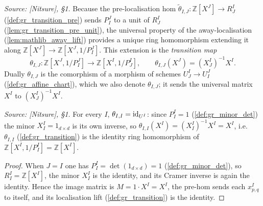 \begin{definition}\leanok
  \label{def:gr_transition}
  \textit{Source: [Nitsure], \S 1.}
  Because the pre-localisation hom \(\tilde\theta_{I,J} : \mathbb{Z}[X^J] \to
  R^I_J\) (\cref{def:gr_transition_pre}) sends \(P^J_I\) to a unit of \(R^I_J\)
  (\cref{lem:gr_transition_pre_unit}), the universal property of the
  away-localisation (\cref{lem:mathlib_away_lift}) provides a unique ring
  homomorphism extending it along \(\mathbb{Z}[X^J] \to \mathbb{Z}[X^J, 1/P^J_I]\).
  This extension is the \emph{transition map}
  \[
    \theta_{I,J} : \mathbb{Z}[X^J, 1/P^J_I] \longrightarrow
    \mathbb{Z}[X^I, 1/P^I_J], \qquad \theta_{I,J}(X^J) = (X^I_J)^{-1} X^I .
  \]
  Dually \(\theta_{I,J}\) is the comorphism of a morphism of schemes
  \(U^I_J \to U^J_I\) (\cref{def:gr_affine_chart}), which we also denote
  \(\theta_{I,J}\); it sends the universal matrix \(X^I\) to \((X^I_J)^{-1} X^I\).
\end{definition}

\begin{lemma}\leanok
  \label{lem:gr_transition_self}
  \textit{Source: [Nitsure], \S 1.}
  For every \(I\), \(\theta_{I,I} = \operatorname{id}_{U^I}\): since \(P^I_I = 1\)
  (\cref{def:gr_minor_det}) the minor \(X^I_I = 1_{d\times d}\) is its own
  inverse, so \(\theta_{I,I}(X^I) = (X^I_I)^{-1} X^I = X^I\), i.e.\
  \(\theta_{I,I}\) (\cref{def:gr_transition}) is the identity ring homomorphism
  of \(\mathbb{Z}[X^I, 1/P^I_I] = \mathbb{Z}[X^I]\).
\end{lemma}
\begin{proof}
  \leanok
  When \(J = I\) one has \(P^I_I = \det(1_{d\times d}) = 1\)
  (\cref{def:gr_minor_det}), so \(R^I_I = \mathbb{Z}[X^I]\), the minor \(X^I_I\)
  is the identity, and its Cramer inverse is again the identity. Hence the image
  matrix is \(M = 1 \cdot X^I = X^I\), the pre-hom sends each \(x^I_{p,q}\) to
  itself, and its localisation lift (\cref{def:gr_transition}) is the identity.
\end{proof}

